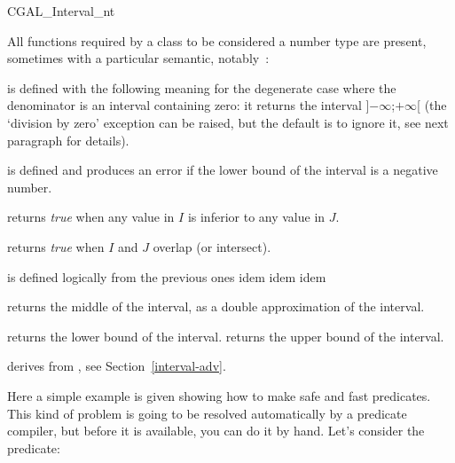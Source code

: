 \begin{ccClass} {CGAL_Interval_nt}


\ccOperations
{}

All functions required by a class to be considered a {\cgal} number type are
present, sometimes with a particular semantic, notably~:


 {is defined with the
following meaning for the degenerate case where the denominator is an interval
containing zero: it returns the interval ]$-\infty$;$+\infty$[ (the `division
by zero' exception can be raised, but the default is to ignore it, see next
paragraph for details).}

 {is defined and
produces an error if the lower bound of the interval is a negative number.}

 {returns {\it true} when any
value in $I$ is inferior to any value in $J$.}

 {returns {\it true} when $I$
and $J$ overlap (or intersect).}

 {is defined logically from the
previous ones}
 {idem}
 {idem}
 {idem}

 {returns the
middle of the interval, as a double approximation of the interval.}

 {returns the lower bound of the interval.}
 {returns the upper bound of the interval.}

\ccImplementation

 derives from , 
see Section~\ref{interval-adv}.

\ccExample

Here a simple example is given showing how to make safe and fast predicates.
This kind of problem is going to be resolved automatically by a predicate
compiler, but before it is available, you can do it by hand.
Let's consider the  predicate:


\end{ccClass}
